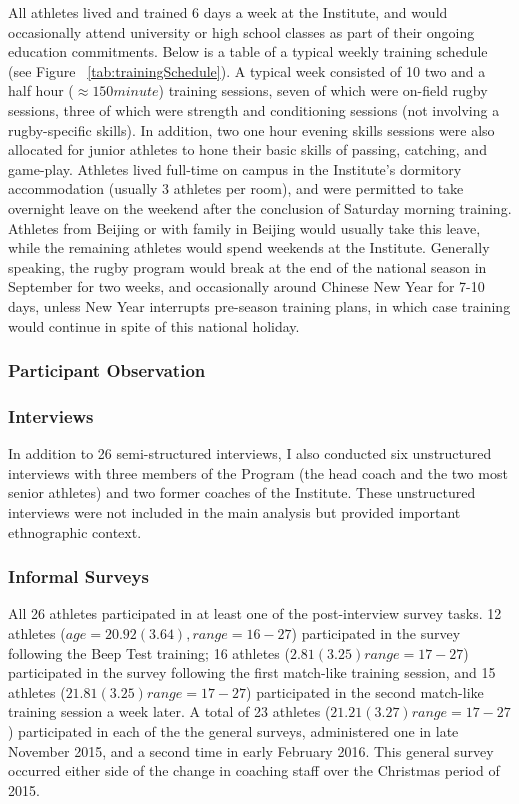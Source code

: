 \begin{CJK}{UTF8}{gbsn}
 All athletes lived and trained 6 days a week at the Institute, and would occasionally attend university or high school classes as part of their ongoing education commitments.  Below is a table of a typical weekly training schedule (see Figure ~\ref{tab:trainingSchedule}). A typical week consisted of 10 two and a half hour ($\approx 150 minute$) training sessions, seven of which were on-field rugby sessions, three of which were strength and conditioning sessions (not involving a rugby-specific skills).  In addition, two one hour evening skills sessions were also allocated for junior athletes to hone their basic skills of passing, catching, and game-play.  Athletes lived full-time on campus in the Institute's dormitory accommodation (usually 3 athletes per room), and were permitted to take overnight leave on the weekend after the conclusion of Saturday morning training.  Athletes from Beijing or with family in Beijing would usually take this leave, while the remaining athletes would spend weekends at the Institute.  Generally speaking, the rugby program would break at the end of the national season in September for two weeks, and occasionally around Chinese New Year for 7-10 days, unless New Year interrupts pre-season training plans, in which case training would continue in spite of this national holiday.






\subsubsection{Participant Observation}

  \subsubsection{Interviews}

  In addition to 26 semi-structured interviews, I also conducted six unstructured interviews with three members of the Program (the head coach and the two most senior athletes) and two former coaches of the Institute.  These unstructured interviews were not included in the main analysis but provided important ethnographic context.

  \subsubsection{Informal Surveys}
  All 26 athletes participated in at least one of the post-interview survey tasks. 12 athletes ($age = 20.92 (3.64), range = 16 - 27$) participated in the survey following the Beep Test training; 16 athletes ($2.81 (3.25) range = 17 - 27$) participated in the survey following the first match-like training session, and 15 athletes ($21.81 (3.25) range = 17 - 27$) participated in the second match-like training session a week later.  A total of 23 athletes ($21.21 (3.27) range = 17-27$) participated in each of the the general surveys, administered one in late November 2015, and a second time in early February 2016. This general survey occurred either side of the change in coaching staff over the Christmas period of 2015.



\end{CJK}
